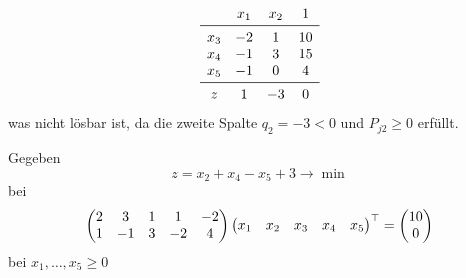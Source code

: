 \begin{solution}
\begin{tasks}
            $$
            \begin{matrix}
                & x_1 & x_2 & 1\\
                \midrule
                x_3 & -2 & 1 & 10\\
                x_4 & -1 & 3 & 15\\
                x_5 & -1 & 0 & 4\\
                \midrule
                z & 1 & -3 & 0
            \end{matrix}
            $$
            was nicht lösbar ist, da die zweite Spalte $q_2=-3<0$ und $P_{j2}\geq 0$ erfüllt.
        \end{tasks}
    \end{solution}

    \begin{exercise}
        Gegeben
        $$ z = x_2 + x_4 - x_5 + 3 \to \min $$
        bei
        $$
        \begin{pmatrix}
            2 & 3 & 1 & 1 & -2\\
            1 & -1 & 3 & -2 & 4
        \end{pmatrix}
        \begin{pmatrix}
            x_1 & x_2 & x_3 & x_4 & x_5
        \end{pmatrix}^{\top}=
        \begin{pmatrix}
            10\\
            0
        \end{pmatrix}
        $$
        bei $x_1,\ldots,x_5\geq 0$
    \end{exercise}

